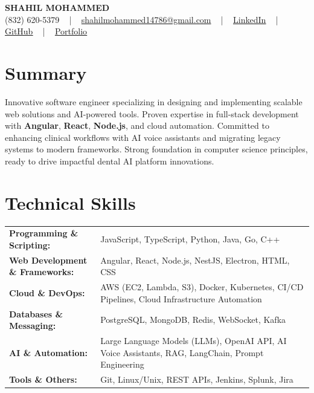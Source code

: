 \documentclass[letterpaper,11pt]{article}
\begin{document}
\begin{center}
    {\fontsize{14pt}{12pt}\selectfont \textbf{\MakeUppercase{Shahil Mohammed}}}\\ \vspace{2pt}
    \fontsize{10pt}{12pt}\selectfont (832) 620-5379 ~ | ~ \href{mailto:shahilmohammed14786@gmail.com}{shahilmohammed14786@gmail.com} ~ | ~  
    \href{https://www.linkedin.com/in/shahil-mohammed-9652931a1/}{\color{blue}\underline{LinkedIn}}  ~ | ~ 
    \href{https://github.com/freakbeast14}{\color{blue}\underline{GitHub}} ~ | ~ 
    \href{https://shahil-mohammed.netlify.app/}{\color{blue}\underline{Portfolio}}
    \vspace{-8pt}
\end{center}

\section{Summary}
\fontsize{9pt}{10pt}\selectfont
Innovative software engineer specializing in designing and implementing scalable web solutions and AI-powered tools. Proven expertise in full-stack development with \textbf{Angular}, \textbf{React}, \textbf{Node.js}, and cloud automation. Committed to enhancing clinical workflows with AI voice assistants and migrating legacy systems to modern frameworks. Strong foundation in computer science principles, ready to drive impactful dental AI platform innovations.
 \vspace{-5pt}
 
\section{Technical Skills}
        \vspace{-14pt}
        \begin{table}[h]
            \fontsize{9pt}{10pt}\selectfont
            \begin{tabular}{p{0.3\linewidth} p{0.7\linewidth}}
                \textbf{Programming \& Scripting:} & JavaScript, TypeScript, Python, Java, Go, C++ \\
                \textbf{Web Development \& Frameworks:} & Angular, React, Node.js, NestJS, Electron, HTML, CSS \\
                \textbf{Cloud \& DevOps:} & AWS (EC2, Lambda, S3), Docker, Kubernetes, CI/CD Pipelines, Cloud Infrastructure Automation \\
                \textbf{Databases \& Messaging:} & PostgreSQL, MongoDB, Redis, WebSocket, Kafka \\
                \textbf{AI \& Automation:} & Large Language Models (LLMs), OpenAI API, AI Voice Assistants, RAG, LangChain, Prompt Engineering \\
                \textbf{Tools \& Others:} & Git, Linux/Unix, REST APIs, Jenkins, Splunk, Jira \\
            \end{tabular}
        \end{table}
 \vspace{-15pt}
 
\end{document}
